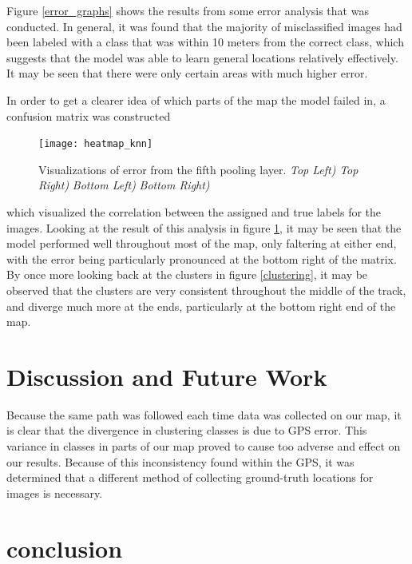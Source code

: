 \documentclass[letterpaper, 12 pt, conference]{ieeeconf}  %
\begin{document}
Figure \ref{error_graphs} shows the results from some error analysis that was conducted. In general, it was found that the majority of misclassified images had been labeled with a class that was within 10 meters from the correct class, which suggests that the model was able to learn general locations relatively effectively. It may be seen that there were only certain areas with much higher error. 
\par
In order to get a clearer idea of which parts of the map the model failed in, a confusion matrix was constructed
\begin{figure}[h]
\centering
\texttt{[image: heatmap\_knn]}
\caption{Visualizations of error from the fifth pooling layer. \textit{Top Left)} \textit{Top Right)} \textit{Bottom Left)} \textit{Bottom Right)}}
\label{confusion_matrix}
\end{figure}
which visualized the correlation between the assigned and true labels for the images. Looking at the result of this analysis in figure \ref{confusion_matrix}, it may be seen that the model performed well throughout most of the map, only faltering at either end, with the error being particularly pronounced at the bottom right of the matrix. By once more looking back at the clusters in figure \ref{clustering}, it may be observed that the clusters are very consistent throughout the middle of the track, and diverge much more at the ends, particularly at the bottom right end of the map. 

\section{Discussion and Future Work}

Because the same path was followed each time data was collected on our map, it is clear that the divergence in clustering classes is due to GPS error. This variance in classes in parts of our map proved to cause too adverse and effect on our results. Because of this inconsistency found within the GPS, it was determined that a different method of collecting ground-truth locations for images is necessary. 

\section{conclusion}


\addtolength{\textheight}{-12cm}   %







\end{document}
